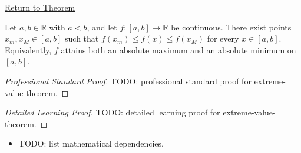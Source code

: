 \newpage
{}
\label{prf:extreme-value-theorem}

\begin{remark*}[Return]
\hyperref[thm:extreme-value-theorem]{Return to Theorem}
\end{remark*}

\begin{theorem*}
Let $a,b \in \mathbb{R}$ with $a<b$, and let $f:[a,b] \to \mathbb{R}$ be continuous. There exist points $x_m,x_M \in [a,b]$ such that $f(x_m) \le f(x) \le f(x_M)$ for every $x \in [a,b]$. Equivalently, $f$ attains both an absolute maximum and an absolute minimum on $[a,b]$.
\end{theorem*}

\begin{proof}[Professional Standard Proof]
\LRAProofBodyStart
TODO: professional standard proof for extreme-value-theorem.
\end{proof}

\begin{proof}[Detailed Learning Proof]
\LRAProofBodyStart
TODO: detailed learning proof for extreme-value-theorem.
\end{proof}

\begin{remark*}
\end{remark*}

\begin{dependencies}
\begin{itemize}
  \item TODO: list mathematical dependencies.
\end{itemize}
\end{dependencies}

\clearpage
